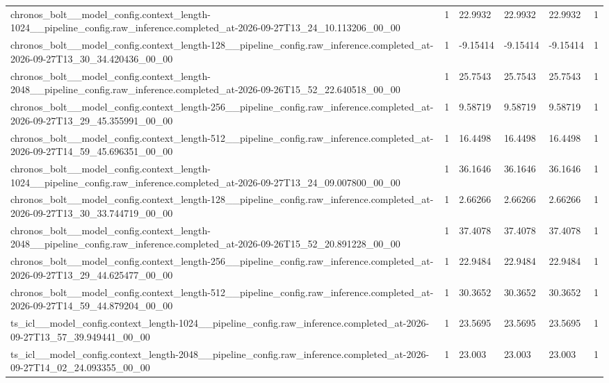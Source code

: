 \begin{tabular}{llllll}
chronos\_bolt\_\_model\_config.context\_length-1024\_\_pipeline\_config.raw\_inference.completed\_at-2026-09-27T13\_24\_10.113206\_00\_00 & 1 & 22.9932 & 22.9932 & 22.9932 & 1 \\
chronos\_bolt\_\_model\_config.context\_length-128\_\_pipeline\_config.raw\_inference.completed\_at-2026-09-27T13\_30\_34.420436\_00\_00 & 1 & -9.15414 & -9.15414 & -9.15414 & 1 \\
chronos\_bolt\_\_model\_config.context\_length-2048\_\_pipeline\_config.raw\_inference.completed\_at-2026-09-26T15\_52\_22.640518\_00\_00 & 1 & 25.7543 & 25.7543 & 25.7543 & 1 \\
chronos\_bolt\_\_model\_config.context\_length-256\_\_pipeline\_config.raw\_inference.completed\_at-2026-09-27T13\_29\_45.355991\_00\_00 & 1 & 9.58719 & 9.58719 & 9.58719 & 1 \\
chronos\_bolt\_\_model\_config.context\_length-512\_\_pipeline\_config.raw\_inference.completed\_at-2026-09-27T14\_59\_45.696351\_00\_00 & 1 & 16.4498 & 16.4498 & 16.4498 & 1 \\
chronos\_bolt\_\_model\_config.context\_length-1024\_\_pipeline\_config.raw\_inference.completed\_at-2026-09-27T13\_24\_09.007800\_00\_00 & 1 & 36.1646 & 36.1646 & 36.1646 & 1 \\
chronos\_bolt\_\_model\_config.context\_length-128\_\_pipeline\_config.raw\_inference.completed\_at-2026-09-27T13\_30\_33.744719\_00\_00 & 1 & 2.66266 & 2.66266 & 2.66266 & 1 \\
chronos\_bolt\_\_model\_config.context\_length-2048\_\_pipeline\_config.raw\_inference.completed\_at-2026-09-26T15\_52\_20.891228\_00\_00 & 1 & 37.4078 & 37.4078 & 37.4078 & 1 \\
chronos\_bolt\_\_model\_config.context\_length-256\_\_pipeline\_config.raw\_inference.completed\_at-2026-09-27T13\_29\_44.625477\_00\_00 & 1 & 22.9484 & 22.9484 & 22.9484 & 1 \\
chronos\_bolt\_\_model\_config.context\_length-512\_\_pipeline\_config.raw\_inference.completed\_at-2026-09-27T14\_59\_44.879204\_00\_00 & 1 & 30.3652 & 30.3652 & 30.3652 & 1 \\
ts\_icl\_\_model\_config.context\_length-1024\_\_pipeline\_config.raw\_inference.completed\_at-2026-09-27T13\_57\_39.949441\_00\_00 & 1 & 23.5695 & 23.5695 & 23.5695 & 1 \\
ts\_icl\_\_model\_config.context\_length-2048\_\_pipeline\_config.raw\_inference.completed\_at-2026-09-27T14\_02\_24.093355\_00\_00 & 1 & 23.003 & 23.003 & 23.003 & 1 \\

\end{tabular}
